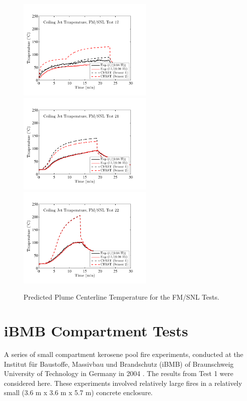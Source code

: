 \begin{figure}[p]
\begin{center}
\includegraphics[width=2.6in]{FIGURES/FM_SNL/FM_SNL_17_Ceiling_Jet} \\
\includegraphics[width=2.6in]{FIGURES/FM_SNL/FM_SNL_21_Ceiling_Jet} \\
\includegraphics[width=2.6in]{FIGURES/FM_SNL/FM_SNL_22_Ceiling_Jet} 
\end{center}
\caption{Predicted Plume Centerline Temperature for the FM/SNL Tests.}
\end{figure}

\clearpage

\section{iBMB Compartment Tests}

A series of small compartment kerosene pool fire experiments, conducted at the
Institut f\"ur Baustoffe, Massivbau und Brandschutz (iBMB) of Braunschweig University of
Technology in Germany in 2004 \cite{Klein-Helbetaling:2005}.  The results from Test 1 were
considered here.  These experiments involved relatively large fires in a relatively small (3.6 m x 3.6 m x 5.7 m) concrete enclosure. 

